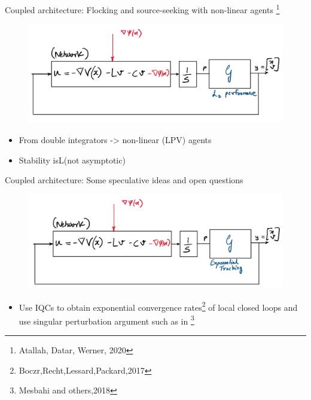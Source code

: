 \begin{frame}{Coupled architecture: Flocking and source-seeking with non-linear agents \footnote{Atallah, Datar, Werner, 2020}}	
	\begin{figure}
		\includegraphics[scale=0.35]{figures/Coupled_flocking_gen_non_lin.JPG}	
		\label{fig:Coupled}
	\end{figure}
	\begin{itemize}
		\item From double integrators -> non-linear (LPV) agents
		\item Stability isL(not asymptotic) 
	\end{itemize}
\end{frame}
\begin{frame}{Coupled architecture: Some speculative ideas and open questions}	
	\begin{figure}
		\includegraphics[scale=0.35]{figures/Coupled_flocking_gen_IQC.JPG}	
		\label{fig:Coupled}
	\end{figure}
	\begin{itemize}
		\item Use IQCs to obtain exponential convergence rates\footnote{Boczr,Recht,Lessard,Packard,2017} of local closed loops and use  singular perturbation argument such as in \footnote{Mesbahi and others,2018} 
	\end{itemize}
\end{frame}